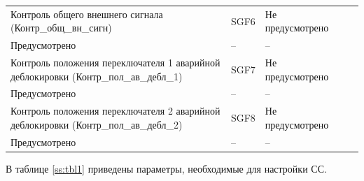 \begin{longtable}{|>{\centering\arraybackslash}m{5.3cm}|>{\centering\arraybackslash}m{3.3cm}|>{\centering\arraybackslash}m{4.2cm}|>{\centering\arraybackslash}m{1.8cm}|>{\centering\arraybackslash}m{1cm}|}
\hline
\centering Контроль общего внешнего сигнала (Контр\_общ\_вн\_сигн)  & \centering SGF6 & \centering Не предусмотрено \\ Предусмотрено & \centering -- & \centering \arraybackslash -- \\
\hline
\centering Контроль положения переключателя 1 аварийной деблокировки (Контр\_пол\_ав\_дебл\_1)  & \centering SGF7 & \centering Не предусмотрено \\ Предусмотрено & \centering -- & \centering \arraybackslash -- \\
\hline
\centering Контроль положения переключателя 2 аварийной деблокировки (Контр\_пол\_ав\_дебл\_2)  & \centering SGF8 & \centering Не предусмотрено \\ Предусмотрено & \centering -- & \centering \arraybackslash -- \\
\hline
\end{longtable}
\normalsize


\par
В таблице \ref{ss:tbl1} приведены параметры, необходимые для настройки СС. 

